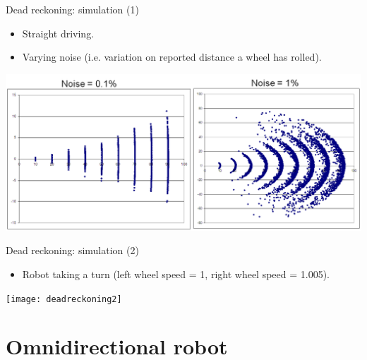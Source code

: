 \documentclass[compress]{beamer}
\begin{document}
\begin{frame}{Dead reckoning: simulation (1)}

\begin{itemize}
    \item Straight driving.
    \item Varying noise (i.e. variation on reported distance a wheel has
  rolled).
\end{itemize}

    \begin{center}
        \includegraphics[width=0.8\linewidth]{deadreckoning1}
    \end{center}

\end{frame}

\begin{frame}{Dead reckoning: simulation (2)}

\begin{itemize}
    \item Robot taking a turn (left wheel speed = 1, right wheel speed = 1.005).
\end{itemize}

    \begin{center}
        \texttt{[image: deadreckoning2]}
    \end{center}
\end{frame}

\section{Omnidirectional robot}
\end{document}
